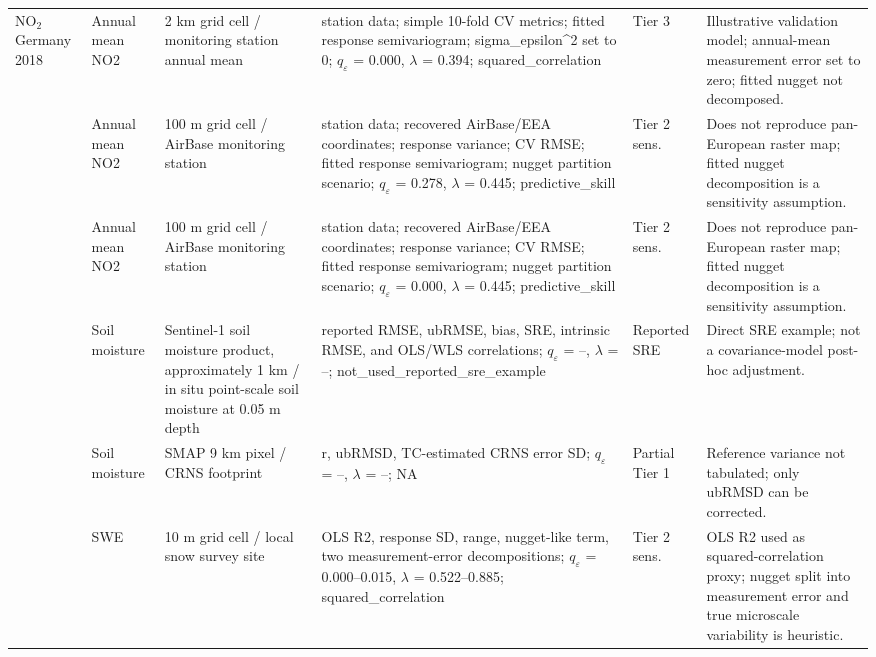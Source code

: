 \begin{table}[t]
\begin{tabular}{p{} p{} p{} p{} p{} p{}}
NO$_2$ Germany 2018 & Annual mean NO2 & 2 km grid cell / monitoring station annual mean & station data; simple 10-fold CV metrics; fitted response semivariogram; sigma\_epsilon\textasciicircum{}2 set to 0; $q_{\varepsilon}$ = 0.000, $\lambda$ = 0.394; squared\_correlation & Tier 3 & Illustrative validation model; annual-mean measurement error set to zero; fitted nugget not decomposed. \\
\citet{vizcaino2018no2} & Annual mean NO2 & 100 m grid cell / AirBase monitoring station & station data; recovered AirBase/EEA coordinates; response variance; CV RMSE; fitted response semivariogram; nugget partition scenario; $q_{\varepsilon}$ = 0.278, $\lambda$ = 0.445; predictive\_skill & Tier 2 sens. & Does not reproduce pan-European raster map; fitted nugget decomposition is a sensitivity assumption. \\
\citet{vizcaino2018no2} & Annual mean NO2 & 100 m grid cell / AirBase monitoring station & station data; recovered AirBase/EEA coordinates; response variance; CV RMSE; fitted response semivariogram; nugget partition scenario; $q_{\varepsilon}$ = 0.000, $\lambda$ = 0.445; predictive\_skill & Tier 2 sens. & Does not reproduce pan-European raster map; fitted nugget decomposition is a sensitivity assumption. \\
\citet{balenzano2021sentinel1} & Soil moisture & Sentinel-1 soil moisture product, approximately 1 km / in situ point-scale soil moisture at 0.05 m depth & reported RMSE, ubRMSE, bias, SRE, intrinsic RMSE, and OLS/WLS correlations; $q_{\varepsilon}$ = --, $\lambda$ = --; not\_used\_reported\_sre\_example & Reported SRE & Direct SRE example; not a covariance-model post-hoc adjustment. \\
\citet{zhao2021subsurface} & Soil moisture & SMAP 9 km pixel / CRNS footprint & r, ubRMSD, TC-estimated CRNS error SD; $q_{\varepsilon}$ = --, $\lambda$ = --; NA & Partial Tier 1 & Reference variance not tabulated; only ubRMSD can be corrected. \\
\citet{plattner2006swe} & SWE & 10 m grid cell / local snow survey site & OLS R2, response SD, range, nugget-like term, two measurement-error decompositions; $q_{\varepsilon}$ = 0.000--0.015, $\lambda$ = 0.522--0.885; squared\_correlation & Tier 2 sens. & OLS R2 used as squared-correlation proxy; nugget split into measurement error and true microscale variability is heuristic. \\
\hline

\end{tabular}
\end{table}
